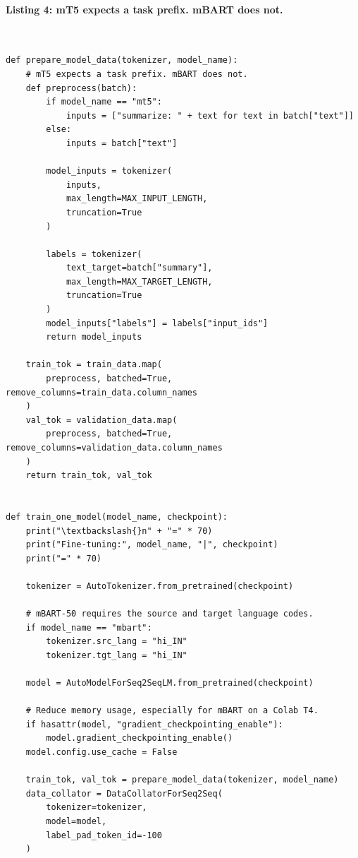 \documentclass[12pt,a4paper,oneside]{report}
\begin{document}
\paragraph{Listing 4: mT5 expects a task prefix. mBART does not.}\mbox{}\\[-1ex]
\begin{Verbatim}[commandchars=\\\{\},breaklines=true,breakanywhere=true,fontsize=\scriptsize,frame=leftline,framesep=2mm,rulecolor=\color{gray}]
def prepare_model_data(tokenizer, model_name):
    # mT5 expects a task prefix. mBART does not.
    def preprocess(batch):
        if model_name == "mt5":
            inputs = ["summarize: " + text for text in batch["text"]]
        else:
            inputs = batch["text"]

        model_inputs = tokenizer(
            inputs,
            max_length=MAX_INPUT_LENGTH,
            truncation=True
        )

        labels = tokenizer(
            text_target=batch["summary"],
            max_length=MAX_TARGET_LENGTH,
            truncation=True
        )
        model_inputs["labels"] = labels["input_ids"]
        return model_inputs

    train_tok = train_data.map(
        preprocess, batched=True, remove_columns=train_data.column_names
    )
    val_tok = validation_data.map(
        preprocess, batched=True, remove_columns=validation_data.column_names
    )
    return train_tok, val_tok


def train_one_model(model_name, checkpoint):
    print("\textbackslash{}n" + "=" * 70)
    print("Fine-tuning:", model_name, "|", checkpoint)
    print("=" * 70)

    tokenizer = AutoTokenizer.from_pretrained(checkpoint)

    # mBART-50 requires the source and target language codes.
    if model_name == "mbart":
        tokenizer.src_lang = "hi_IN"
        tokenizer.tgt_lang = "hi_IN"

    model = AutoModelForSeq2SeqLM.from_pretrained(checkpoint)

    # Reduce memory usage, especially for mBART on a Colab T4.
    if hasattr(model, "gradient_checkpointing_enable"):
        model.gradient_checkpointing_enable()
    model.config.use_cache = False

    train_tok, val_tok = prepare_model_data(tokenizer, model_name)
    data_collator = DataCollatorForSeq2Seq(
        tokenizer=tokenizer,
        model=model,
        label_pad_token_id=-100
    )


\end{Verbatim}
\end{document}
